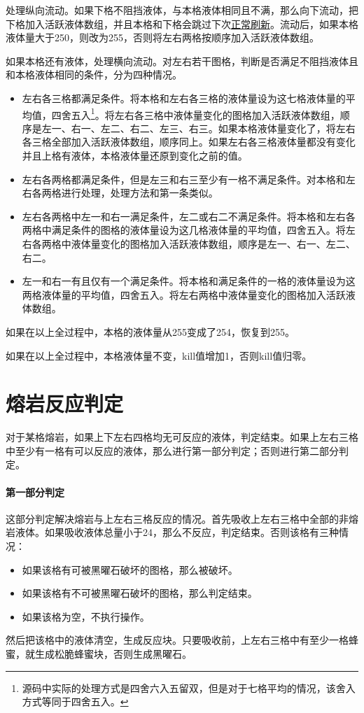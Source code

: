 处理纵向流动。如果下格不阻挡液体，与本格液体相同且不满，那么向下流动，把下格加入活跃液体数组，并且本格和下格会跳过下次\hyperref[app27]{正常刷新}。流动后，如果本格液体量大于250，则改为255，否则将左右两格按顺序加入活跃液体数组。

如果本格还有液体，处理横向流动。对左右若干图格，判断是否满足不阻挡液体且和本格液体相同的条件，分为四种情况。
\begin{itemize}
    \item 左右各三格都满足条件。将本格和左右各三格的液体量设为这七格液体量的平均值，四舍五入\footnote{源码中实际的处理方式是四舍六入五留双，但是对于七格平均的情况，该舍入方式等同于四舍五入。}。将左右各三格中液体量变化的图格加入活跃液体数组，顺序是左一、右一、左二、右二、左三、右三。如果本格液体量变化了，将左右各三格全部加入活跃液体数组，顺序同上。如果左右各三格液体量都没有变化并且上格有液体，本格液体量还原到变化之前的值。
    \item 左右各两格都满足条件，但是左三和右三至少有一格不满足条件。对本格和左右各两格进行处理，处理方法和第一条类似。
    \item 左右各两格中左一和右一满足条件，左二或右二不满足条件。将本格和左右各两格中满足条件的图格的液体量设为这几格液体量的平均值，四舍五入。将左右各两格中液体量变化的图格加入活跃液体数组，顺序是左一、右一、左二、右二。
    \item 左一和右一有且仅有一个满足条件。将本格和满足条件的一格的液体量设为这两格液体量的平均值，四舍五入。将左右两格中液体量变化的图格加入活跃液体数组。
\end{itemize}

如果在以上全过程中，本格的液体量从255变成了254，恢复到255。

如果在以上全过程中，本格液体量不变，kill值增加1，否则kill值归零。

\section{熔岩反应判定}\label{app24}
对于某格熔岩，如果上下左右四格均无可反应的液体，判定结束。如果上左右三格中至少有一格有可以反应的液体，那么进行第一部分判定；否则进行第二部分判定。

\paragraph*{第一部分判定}
这部分判定解决熔岩与上左右三格反应的情况。首先吸收上左右三格中全部的非熔岩液体。如果吸收液体总量小于24，那么不反应，判定结束。否则该格有三种情况：
\begin{itemize}
    \item 如果该格有可被黑曜石破坏的图格，那么被破坏。
    \item 如果该格有不可被黑曜石破坏的图格，那么判定结束。
    \item 如果该格为空，不执行操作。
\end{itemize}
然后把该格中的液体清空，生成反应块。只要吸收前，上左右三格中有至少一格蜂蜜，就生成松脆蜂蜜块，否则生成黑曜石。

